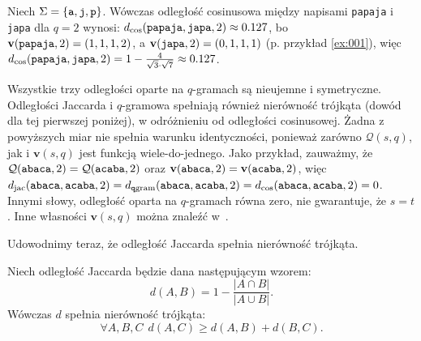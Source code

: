 \documentclass{praca1}
\begin{document}
\begin{example}
Niech $\Sigma = \{\verb|a|, \verb|j|, \verb|p|\}$. Wówczas odległość cosinusowa między napisami \verb|papaja| i \verb|japa| dla $q = 2$ wynosi: $d_{\mathrm{cos}}(\verb|papaja|, \verb|japa|, 2) \approx 0.127$, bo $\mathbf{v}( \verb|papaja|,2) = (1, 1, 1, 2)$, a  $\mathbf{v}( \verb|japa|,2) = (0, 1, 1, 1)$ (p. przykład \ref{ex:001}), więc $d_{\mathrm{cos}}(\verb|papaja|, \verb|japa|, 2) = 1 - \frac{4}{\sqrt{3}\cdot\sqrt{7}} \approx 0.127$.
\end{example}

Wszystkie trzy odległości oparte na $q$-gramach są nieujemne i symetryczne. Odległości Jaccarda i $q$-gramowa spełniają również nierówność trójkąta (dowód dla tej pierwszej poniżej), w odróżnieniu od odległości cosinusowej. Żadna z powyższych miar nie spełnia warunku identyczności, ponieważ zarówno $\mathcal{Q}(s,q)$, jak i $\mathbf{v}(s,q)$ jest funkcją wiele-do-jednego. Jako przykład, zauważmy, że $\mathcal{Q}(\verb|abaca|,2) = \mathcal{Q}(\verb|acaba|,2)$ oraz $\mathbf{v}(\verb|abaca|,2) = \mathbf{v}(\verb|acaba|,2)$, więc $d_{\mathrm{jac}}(\verb|abaca|, \verb|acaba|, 2) = d_{\mathtt{q}\mathrm{gram}}(\verb|abaca|, \verb|acaba|, 2) = d_{\mathrm{cos}}(\verb|abaca|, \verb|acaba|, 2) = 0$. Innymi słowy, odległość oparta na $q$-gramach równa zero, nie gwarantuje, że $s = t$. Inne własności $\mathbf{v}(s,q)$ można znaleźć w~\cite{Ukkonen1992:approxqgrams}.

Udowodnimy teraz, że odległość Jaccarda spełnia nierówność trójkąta.

\begin{lemma}
Niech odległość Jaccarda będzie dana następującym wzorem:
$$
d(A, B) = 1 - \frac{|A\cap B|}{|A\cup B|} .
$$
Wówczas $d$ spełnia nierówność trójkąta:
$$
\forall A, B, C\ \ d(A, C) \geq d(A,B) + d(B, C).
$$
\end{lemma}
\end{document}
